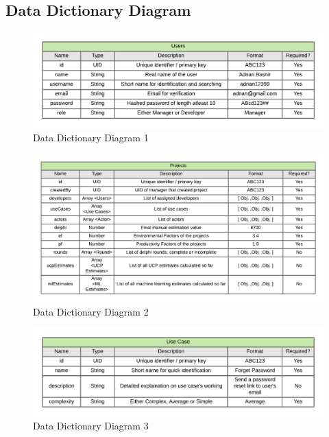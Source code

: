 
\subsection{Data Dictionary Diagram}


\begin{figure}[H]
    \centering
    \includegraphics[scale=0.7]{./diagrams/data-dictionary/dd-1.png}
    \caption{Data Dictionary Diagram 1}
    \label{fig:dd-diag-1}

\end{figure}


\begin{figure}[H]
    \centering
    \includegraphics[scale=0.7]{./diagrams/data-dictionary/dd-2.png}
    \caption{Data Dictionary Diagram 2}
    \label{fig:dd-diag-2}
\end{figure}


\begin{figure}[H]
    \centering
    \includegraphics[scale=0.7]{./diagrams/data-dictionary/dd-3.png}
    \caption{Data Dictionary Diagram 3}
    \label{fig:dd-diag-3}

\end{figure}


